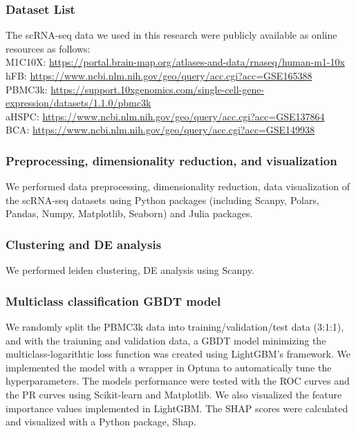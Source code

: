 \documentclass{article}
\begin{document}
\subsubsection*{Dataset List}
The scRNA-seq data we used in this research were publicly available as online
resources as follows:\\
M1C10X: \url{https://portal.brain-map.org/atlases-and-data/rnaseq/human-m1-10x}\\
hFB: \url{https://www.ncbi.nlm.nih.gov/geo/query/acc.cgi?acc=GSE165388}\\
PBMC3k: \url{https://support.10xgenomics.com/single-cell-gene-expression/datasets/1.1.0/pbmc3k}\\
aHSPC: \url{https://www.ncbi.nlm.nih.gov/geo/query/acc.cgi?acc=GSE137864}\\
BCA: \url{https://www.ncbi.nlm.nih.gov/geo/query/acc.cgi?acc=GSE149938}

\subsubsection*{Preprocessing, dimensionality reduction, and visualization}
We performed data preprocessing, dimensionality reduction, data visualization
of the scRNA-seq datasets using Python packages (including Scanpy\cite{scanpy}, Polars,
Pandas\cite{pandas}, Numpy, Matplotlib\cite{matplotlib}, Seaborn\cite{seaborn}) and Julia packages.

\subsubsection*{Clustering and DE analysis}
We performed leiden clustering, DE analysis using Scanpy.

\subsubsection*{Multiclass classification GBDT model}
We randomly split the PBMC3k data into training/validation/test data (3:1:1), and with the traiuning and validation 
data, a GBDT model minimizing the multiclass-logarithtic loss function was created using LightGBM's 
framework. We implemented the model with a wrapper in Optuna to automatically tune the hyperparameters. The 
models performance were tested with the ROC curves and the PR curves using Scikit-learn and Matplotlib. We 
also visualized the feature importance values implemented in LightGBM. The SHAP scores were calculated and visualized 
with a Python package, Shap\cite{shap,shap_treeexplainer}.
\end{document}
